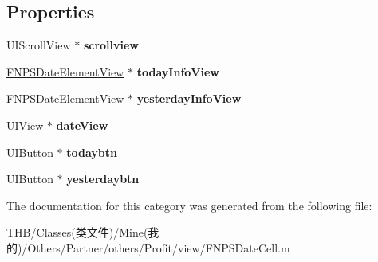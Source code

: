 \subsection*{Properties}
\begin{DoxyCompactItemize}
\item 
\mbox{\label{category_f_n_p_s_date_cell_07_08_aa6d1a37a0bf9b42c2dfeeb80aac43f00}} 
U\+I\+Scroll\+View $\ast$ {\bfseries scrollview}
\item 
\mbox{\label{category_f_n_p_s_date_cell_07_08_a07bbdaed54442641e23096d1eacc9501}} 
\mbox{\hyperlink{interface_f_n_p_s_date_element_view}{F\+N\+P\+S\+Date\+Element\+View}} $\ast$ {\bfseries today\+Info\+View}
\item 
\mbox{\label{category_f_n_p_s_date_cell_07_08_a58b3f40fca89c138d5ac9f1e7b7b47d0}} 
\mbox{\hyperlink{interface_f_n_p_s_date_element_view}{F\+N\+P\+S\+Date\+Element\+View}} $\ast$ {\bfseries yesterday\+Info\+View}
\item 
\mbox{\label{category_f_n_p_s_date_cell_07_08_adb28ee682e41c2e8f22154db0f6a8431}} 
U\+I\+View $\ast$ {\bfseries date\+View}
\item 
\mbox{\label{category_f_n_p_s_date_cell_07_08_a73ac2d3db376d33577ba3e25761aea59}} 
U\+I\+Button $\ast$ {\bfseries todaybtn}
\item 
\mbox{\label{category_f_n_p_s_date_cell_07_08_a012050d68e224efac491eae7a5b29c8b}} 
U\+I\+Button $\ast$ {\bfseries yesterdaybtn}
\end{DoxyCompactItemize}


The documentation for this category was generated from the following file\+:\begin{DoxyCompactItemize}
\item 
T\+H\+B/\+Classes(类文件)/\+Mine(我的)/\+Others/\+Partner/others/\+Profit/view/F\+N\+P\+S\+Date\+Cell.\+m\end{DoxyCompactItemize}
